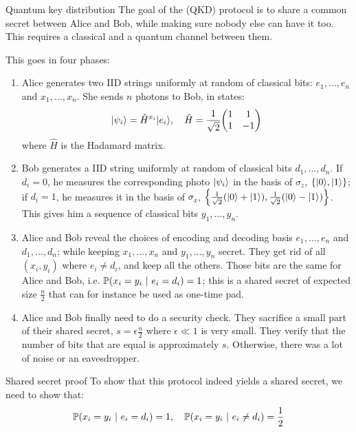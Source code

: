 \documentclass[a4paper]{article}
\begin{document}
\begin{parag}{Quantum key distribution}
    The goal of the  (QKD) protocol is to share a common secret between Alice and Bob, while making sure nobody else can have it too. This requires a classical and a quantum channel between them.

    This goes in four phases:
    \begin{enumerate}
        \item Alice generates two IID strings uniformly at random of classical bits: $e_1, \ldots, e_n$ and $x_1, \ldots, x_n$. She sends $n$ photons to Bob, in states: 
        \[\ket{\psi_i} = \hat{H}^{x_i} \ket{e_i}, \mathspace \hat{H} = \frac{1}{\sqrt{2}} \begin{pmatrix} 1 & 1 \\ 1 & -1 \end{pmatrix} \]
        where $\hat{H}$ is the Hadamard matrix.
        \item Bob generates a IID string uniformly at random of classical bits $d_1, \ldots, d_n$. If $d_i = 0$, he measures the corresponding photo $\ket{\psi_i}$ in the basis of $\sigma_z$, $\left\{\ket{0}, \ket{1}\right\}$; if $d_i = 1$, he measures it in the basis of $\sigma_x$, $\left\{\frac{1}{\sqrt{2}}\left(\ket{0} + \ket{1}\right), \frac{1}{\sqrt{2}}\left(\ket{0} - \ket{1}\right)\right\}$. This gives him a sequence of classical bits $y_1, \ldots, y_n$.
        \item Alice and Bob reveal the choices of encoding and decoding basis $e_1, \ldots, e_n$ and $d_1, \ldots, d_n$; while keeping $x_1, \ldots, x_n$ and $y_1, \ldots, y_n$ secret. They get rid of all $\left(x_i, y_i\right)$ where $e_i \neq d_i$, and keep all the others. Those bits are the same for Alice and Bob, i.e. $\prob\left(x_i = y_i \suchthat e_i = d_i\right) = 1$; this is a shared secret of expected size $\frac{n}{2}$ that can for instance be used as one-time pad.
        \item Alice and Bob finally need to do a security check. They sacrifice a small part of their shared secret, $s = \epsilon \frac{n}{2}$ where $\epsilon \ll 1$ is very small. They verify that the number of bits that are equal is approximately $s$. Otherwise, there was a lot of noise or an eavesdropper.
    \end{enumerate}
    
    \begin{subparag}{Shared secret proof}
        To show that this protocol indeed yields a shared secret, we need to show that: 
        \[\prob\left(x_i = y_i \suchthat e_i = d_i\right) = 1, \mathspace \prob\left(x_i = y_i \suchthat e_i \neq d_i\right) = \frac{1}{2}\]
        

\end{subparag}
\end{parag}
\end{document}
